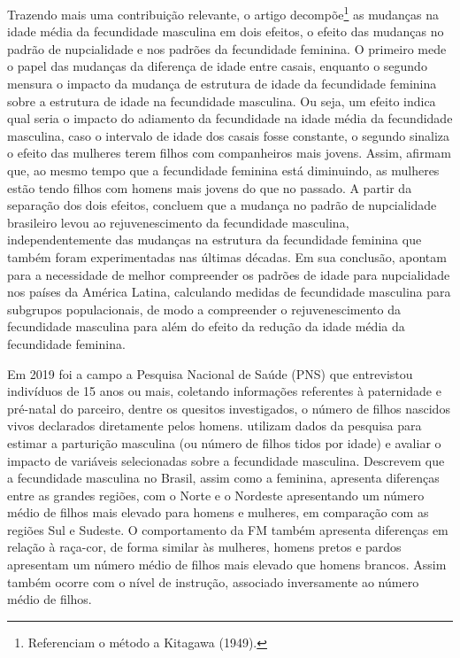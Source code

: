 Trazendo mais uma contribuição relevante, o artigo decompõe\footnote{Referenciam o método a Kitagawa (1949).} as mudanças na idade média da fecundidade masculina em dois efeitos, o efeito das mudanças no padrão de nupcialidade e nos padrões da fecundidade feminina. O primeiro mede o papel das mudanças da diferença de idade entre casais, enquanto o segundo mensura o impacto da mudança de estrutura de idade da fecundidade feminina sobre a estrutura de idade na fecundidade masculina. Ou seja, um efeito indica qual seria o impacto do adiamento da fecundidade na idade média da fecundidade masculina, caso o intervalo de idade dos casais fosse constante, o segundo sinaliza o efeito das mulheres terem filhos com companheiros mais jovens. Assim, afirmam que, ao mesmo tempo que a fecundidade feminina está diminuindo, as mulheres estão tendo filhos com homens mais jovens do que no passado. A partir da separação dos dois efeitos, concluem que a mudança no padrão de nupcialidade brasileiro levou ao rejuvenescimento da fecundidade masculina, independentemente das mudanças na estrutura da fecundidade feminina que também foram experimentadas nas últimas décadas. Em sua conclusão,  apontam para a necessidade de melhor compreender os padrões de idade para nupcialidade nos países da América Latina, calculando medidas de fecundidade masculina para subgrupos populacionais, de modo a compreender o rejuvenescimento da fecundidade masculina para além do efeito da redução da idade média da fecundidade feminina.

Em 2019 foi a campo a Pesquisa Nacional de Saúde (PNS) que entrevistou indivíduos de 15 anos ou mais, coletando informações referentes à paternidade e pré-natal do parceiro, dentre os quesitos investigados, o número de filhos nascidos vivos declarados diretamente pelos homens.  utilizam dados da pesquisa para estimar a parturição masculina (ou número de filhos tidos por idade) e avaliar o impacto de variáveis selecionadas sobre a fecundidade masculina. Descrevem que a fecundidade masculina no Brasil, assim como a feminina, apresenta diferenças entre as grandes regiões, com o Norte e o Nordeste apresentando um número médio de filhos mais elevado para homens e mulheres, em comparação com as regiões Sul e Sudeste. O comportamento da FM também apresenta diferenças em relação à raça-cor, de forma similar às mulheres, homens pretos e pardos apresentam um número médio de filhos mais elevado que homens brancos. Assim também ocorre com o nível de instrução, associado inversamente ao número médio de filhos.  

